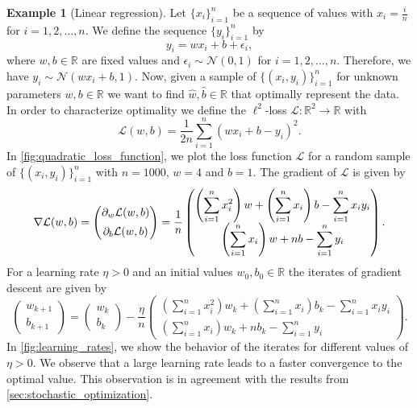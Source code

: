 \documentclass[12pt]{article}
\theoremstyle{definition}
\newtheorem{example}[example]{Example}
\numberwithin{equation}{section}
\newcommand{\R}{\mathbb{R}}
\newcommand{\CL}{\mathcal{L}}
\newcommand{\CN}{\mathcal{N}}
\begin{document}
\begin{example}[Linear regression]
  \label{ex:linear_regression}
  Let $\{x_i\}_{i=1}^n$ be a sequence of values with $x_i = \frac{i}{n}$ for $i = 1,2,\dots,n$. We define the sequence $\{y_i\}_{i=1}^n$ by
  \begin{equation*}
    y_i = wx_i + b + \epsilon_i,
  \end{equation*}
  where $w,b \in \R$ are fixed values and $\epsilon_i \sim \CN(0,1)$ for $i = 1, 2, \dots, n$. Therefore, we have $y_i \sim \CN(wx_i + b,1)$.
  Now, given a sample of $\{(x_i, y_i)\}_{i=1}^n$ for unknown parameters $w, b \in \R$ we want to find $\hat{w}, \hat{b} \in \R$ that optimally represent the data. In order to characterize optimality we define the $\ell^2$-loss $\CL : \R^2 \rightarrow \R$ with 
  \begin{equation}
    \CL (w, b) = \frac{1}{2n} \sum_{i=1}^n(wx_i + b  - y_i)^2.
  \end{equation}
  In \autoref{fig:quadratic_loss_function}, we plot the loss function $\CL$ for a random sample of $\{(x_i, y_i)\}_{i=1}^n$ with $n = 1000$, $w=4$ and $b=1$. The gradient of $\CL$ is given by
  \[
    \nabla \CL (w,b) = 
    \begin{pmatrix}
      \displaystyle\partial_w\CL(w,b) \\
      \addlinespace
      \displaystyle\partial_b\CL(w,b) 
    \end{pmatrix}
    = \frac{1}{n}
    \begin{pmatrix}
      \left(\displaystyle\sum_{i=1}^n x_i^2\right)w +  \left(\displaystyle\sum_{i=1}^n x_i\right)b -  \displaystyle\sum_{i=1}^n x_i y_i \\
       \left(\displaystyle\sum_{i=1}^n x_i\right) w + nb -  \displaystyle\sum_{i=1}^n y_i
    \end{pmatrix}.
  \]
  For a learning rate $\eta > 0$ and an initial values $w_{0},b_0 \in \R$ the iterates of gradient descent are given by
  \begin{equation*}
    \begin{pmatrix}
      w_{k+1} \\
      b_{k+1}
    \end{pmatrix}
    =
    \begin{pmatrix}
      w_{k} \\
      b_k
    \end{pmatrix}
    - \frac{\eta}{n}
    \begin{pmatrix}
      \left(\displaystyle\sum_{i=1}^n x_i^2\right)w_k +  \left(\displaystyle\sum_{i=1}^n x_i\right)b_k -  \displaystyle\sum_{i=1}^n x_i y_i \\
       \left(\displaystyle\sum_{i=1}^n x_i\right) w_k + nb_k -  \displaystyle\sum_{i=1}^n y_i
    \end{pmatrix}.
  \end{equation*}
  In \autoref{fig:learning_rates}, we show the behavior of the iterates for different values of $\eta >0$. We observe that a large learning rate leads to a faster convergence to the optimal value. This observation is in agreement with the results from \autoref{sec:stochastic_optimization}.


\end{example}
\end{document}
